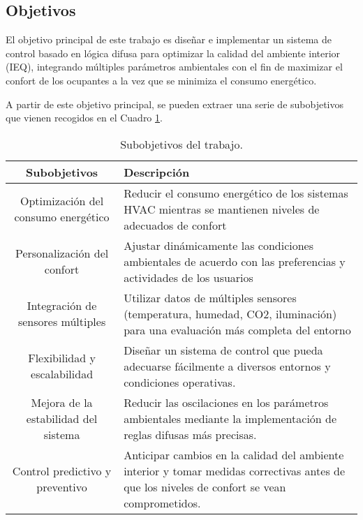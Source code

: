 \subsection{Objetivos}

El objetivo principal de este trabajo es diseñar e implementar un sistema de control basado en lógica difusa para optimizar la calidad del ambiente interior (IEQ), integrando múltiples parámetros ambientales con el fin de maximizar el confort de los ocupantes a la vez que se minimiza el consumo energético.

A partir de este objetivo principal, se pueden extraer una serie de subobjetivos que vienen recogidos en el Cuadro \ref{tab:subobjetivos}.

\begin{table}[H]
	\centering
	\begin{tabular}{| c | p{9.6cm} |}
		\hline
		\rowcolor{lightgray}
		\textbf{Subobjetivos} & \textbf{Descripción} \\
		\hline
		Optimización del consumo energético & 
		Reducir el consumo energético de los sistemas HVAC mientras se mantienen niveles de adecuados de confort \vspace{0.2cm} \\
		\hline
		Personalización del confort &
		Ajustar dinámicamente las condiciones ambientales de acuerdo con las preferencias y actividades de los usuarios
		\vspace{0.2cm} \\
		\hline
		Integración de sensores múltiples & 
		Utilizar datos de múltiples sensores (temperatura, humedad, CO2, iluminación) para una evaluación más completa del entorno 
		\vspace{0.2cm} \\
		\hline
		Flexibilidad y escalabilidad & 
		Diseñar un sistema de control que pueda adecuarse fácilmente a diversos entornos y condiciones operativas.
		\vspace{0.2cm} \\
		\hline
		Mejora de la estabilidad del sistema & 
		Reducir las oscilaciones en los parámetros ambientales mediante la implementación de reglas difusas más precisas.
		\vspace{0.2cm} \\
		\hline
		Control predictivo y preventivo & 
		Anticipar cambios en la calidad del ambiente interior y tomar medidas correctivas antes de que los niveles de confort se vean comprometidos.
		\vspace{0.2cm} \\
		\hline
	\end{tabular}
	\caption{Subobjetivos del trabajo.}
	\label{tab:subobjetivos}
\end{table}